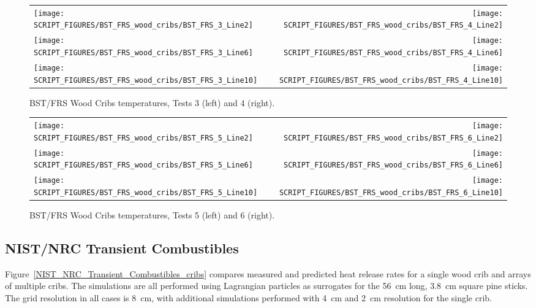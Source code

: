\begin{figure}[p]
\begin{tabular*}{\textwidth}{l@{\extracolsep{\fill}}r}
\texttt{[image: SCRIPT\_FIGURES/BST\_FRS\_wood\_cribs/BST\_FRS\_3\_Line2]} &
\texttt{[image: SCRIPT\_FIGURES/BST\_FRS\_wood\_cribs/BST\_FRS\_4\_Line2]} \\
\texttt{[image: SCRIPT\_FIGURES/BST\_FRS\_wood\_cribs/BST\_FRS\_3\_Line6]} & 
\texttt{[image: SCRIPT\_FIGURES/BST\_FRS\_wood\_cribs/BST\_FRS\_4\_Line6]} \\
\texttt{[image: SCRIPT\_FIGURES/BST\_FRS\_wood\_cribs/BST\_FRS\_3\_Line10]} &
\texttt{[image: SCRIPT\_FIGURES/BST\_FRS\_wood\_cribs/BST\_FRS\_4\_Line10]}    
\end{tabular*}
\caption[BST/FRS Wood Cribs temperatures, Tests 3 and 4]{BST/FRS Wood Cribs temperatures, Tests 3 (left) and 4 (right).}
\label{BST_FRS_wood_cribs_Tests_3to4}
\end{figure}

\begin{figure}[p]
\begin{tabular*}{\textwidth}{l@{\extracolsep{\fill}}r}
\texttt{[image: SCRIPT\_FIGURES/BST\_FRS\_wood\_cribs/BST\_FRS\_5\_Line2]} &
\texttt{[image: SCRIPT\_FIGURES/BST\_FRS\_wood\_cribs/BST\_FRS\_6\_Line2]} \\
\texttt{[image: SCRIPT\_FIGURES/BST\_FRS\_wood\_cribs/BST\_FRS\_5\_Line6]} &
\texttt{[image: SCRIPT\_FIGURES/BST\_FRS\_wood\_cribs/BST\_FRS\_6\_Line6]} \\
\texttt{[image: SCRIPT\_FIGURES/BST\_FRS\_wood\_cribs/BST\_FRS\_5\_Line10]} &
\texttt{[image: SCRIPT\_FIGURES/BST\_FRS\_wood\_cribs/BST\_FRS\_6\_Line10]}
\end{tabular*}
\caption[BST/FRS Wood Cribs temperatures, Tests 5 and 6]{BST/FRS Wood Cribs temperatures, Tests 5 (left) and 6 (right).}
\label{BST_FRS_wood_cribs_Tests_5to6}
\end{figure}

\clearpage


\subsection{NIST/NRC Transient Combustibles}

Figure~\ref{NIST_NRC_Transient_Combustibles_cribs} compares measured and predicted heat release rates for a single wood crib and arrays of multiple cribs. The simulations are all performed using Lagrangian particles as surrogates for the 56~cm long, 3.8~cm square pine sticks. The grid resolution in all cases is 8~cm, with additional simulations performed with 4~cm and 2~cm resolution for the single crib.

